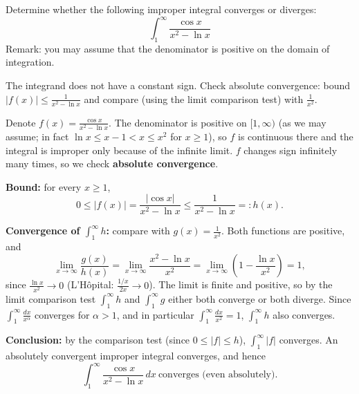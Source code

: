 
\begin{question}
Determine whether the following improper integral converges or diverges:
\[ \int_1^\infty \frac{\cos x}{x^2 - \ln x} \]
Remark: you may assume that the denominator is positive on the domain of integration.
\end{question}

\begin{hint}
The integrand does not have a constant sign. Check absolute convergence: bound $|f(x)| \le \frac{1}{x^2 - \ln x}$ and compare (using the limit comparison test) with $\frac{1}{x^2}$.
\end{hint}

\begin{solution}
Denote $f(x) = \frac{\cos x}{x^2 - \ln x}$. The denominator is positive on $[1, \infty)$ (as we may assume; in fact $\ln x \le x - 1 < x \le x^2$ for $x \ge 1$), so $f$ is continuous there and the integral is improper only because of the infinite limit. $f$ changes sign infinitely many times, so we check \textbf{absolute convergence}.

\textbf{Bound:} for every $x \ge 1$,
\[ 0 \le |f(x)| = \frac{|\cos x|}{x^2 - \ln x} \le \frac{1}{x^2 - \ln x} =: h(x). \]

\textbf{Convergence of $\int_1^\infty h$:} compare with $g(x) = \frac{1}{x^2}$. Both functions are positive, and
\[ \lim_{x\to\infty} \frac{g(x)}{h(x)} = \lim_{x\to\infty} \frac{x^2 - \ln x}{x^2} = \lim_{x\to\infty} \left( 1 - \frac{\ln x}{x^2} \right) = 1, \]
since $\frac{\ln x}{x^2} \to 0$ (L'Hôpital: $\frac{1/x}{2x} \to 0$). The limit is finite and positive, so by the limit comparison test $\int_1^\infty h$ and $\int_1^\infty g$ either both converge or both diverge. Since $\int_1^\infty \frac{dx}{x^\alpha}$ converges for $\alpha > 1$, and in particular $\int_1^\infty \frac{dx}{x^2} = 1$, $\int_1^\infty h$ also converges.

\textbf{Conclusion:} by the comparison test (since $0 \le |f| \le h$), $\int_1^\infty |f|$ converges. An absolutely convergent improper integral converges, and hence
\[ \int_1^\infty \frac{\cos x}{x^2 - \ln x}\,dx \ \text{converges (even absolutely).} \]
\end{solution}
